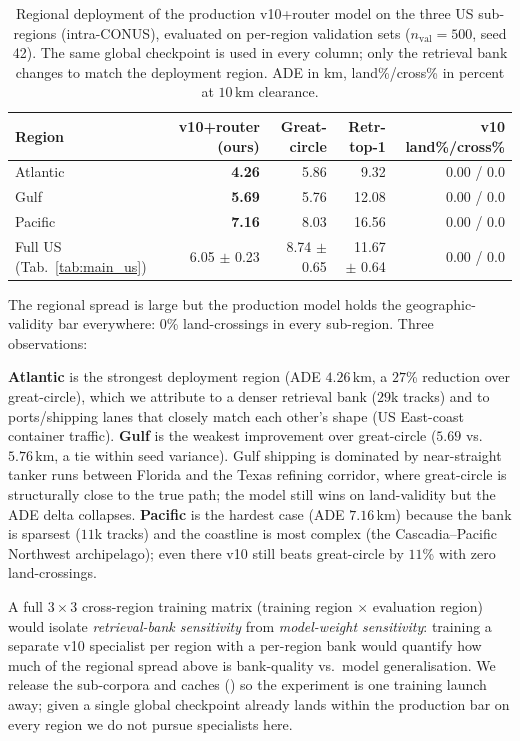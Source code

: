 \documentclass[11pt]{article}
\begin{document}
\begin{table}[h]
  \centering
  \small
  \caption{Regional deployment of the production v10+router model on
  the three US sub-regions (intra-CONUS), evaluated on per-region
  validation sets ($n_{\text{val}}=500$, seed 42). The same global
  checkpoint is used in every column; only the retrieval bank changes
  to match the deployment region. ADE in km, land\%/cross\% in percent
  at $10$\,km clearance.}
  \label{tab:regional}
  \begin{tabular}{lrrrr}
    \toprule
    Region    & v10+router (ours) & Great-circle & Retr-top-1 & v10 land\%/cross\% \\
    \midrule
    Atlantic  & \textbf{4.26}      & 5.86         & 9.32        & 0.00 / 0.0 \\
    Gulf      & \textbf{5.69}      & 5.76         & 12.08       & 0.00 / 0.0 \\
    Pacific   & \textbf{7.16}      & 8.03         & 16.56       & 0.00 / 0.0 \\
    \midrule
    Full US (Tab.~\ref{tab:main_us}) & 6.05 $\pm$ 0.23 & 8.74 $\pm$ 0.65 & 11.67 $\pm$ 0.64 & 0.00 / 0.0 \\
    \bottomrule
  \end{tabular}
\end{table}

The regional spread is large but the production model holds the
geographic-validity bar everywhere: $0$\% land-crossings in every
sub-region. Three observations:

\textbf{Atlantic} is the strongest deployment region (ADE $4.26$\,km, a
$27$\% reduction over great-circle), which we attribute to a denser
retrieval bank ($29$k tracks) and to ports/shipping lanes that closely
match each other's shape (US East-coast container traffic).
\textbf{Gulf} is the weakest improvement over great-circle ($5.69$ vs.\
$5.76$\,km, a tie within seed variance). Gulf shipping is dominated by
near-straight tanker runs between Florida and the Texas refining
corridor, where great-circle is structurally close to the true path;
the model still wins on land-validity but the ADE delta collapses.
\textbf{Pacific} is the hardest case (ADE $7.16$\,km) because the bank
is sparsest ($11$k tracks) and the coastline is most complex (the
Cascadia--Pacific Northwest archipelago); even there v10 still beats
great-circle by $11$\% with zero land-crossings.

A full $3 \times 3$ cross-region training matrix (training region
$\times$ evaluation region) would isolate \emph{retrieval-bank
sensitivity} from \emph{model-weight sensitivity}: training a separate
v10 specialist per region with a per-region bank would quantify how
much of the regional spread above is bank-quality vs.\ model
generalisation. We release the sub-corpora and caches ()
so the experiment is one training launch away; given a single global
checkpoint already lands within the production bar on every region we
do not pursue specialists here.
\end{document}
